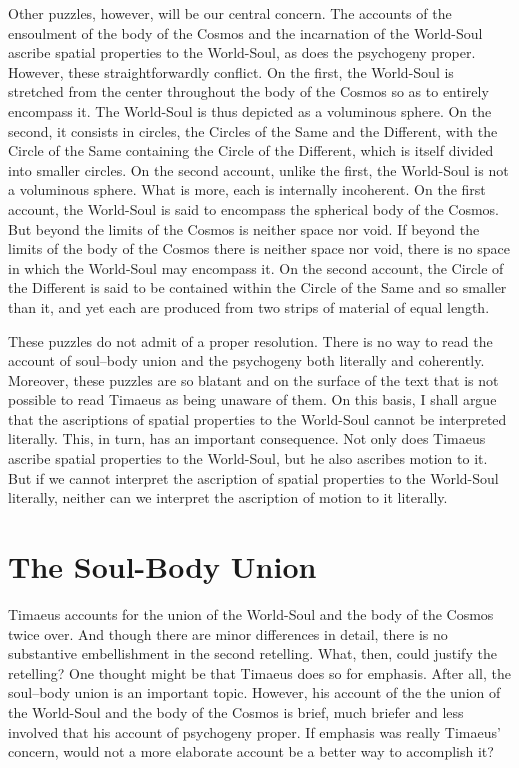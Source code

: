 Other puzzles, however, will be our central concern. The accounts of the ensoulment of the body of the Cosmos and the incarnation of the World-Soul ascribe spatial properties to the World-Soul, as does the psychogeny proper. However, these straightforwardly conflict. On the first, the World-Soul is stretched from the center throughout the body of the Cosmos so as to entirely encompass it. The World-Soul is thus depicted as a voluminous sphere. On the second, it consists in circles, the Circles of the Same and the Different, with the Circle of the Same containing the Circle of the Different, which is itself divided into smaller circles. On the second account, unlike the first, the World-Soul is not a voluminous sphere. What is more, each is internally incoherent. On the first account, the World-Soul is said to encompass the spherical body of the Cosmos. But beyond the limits of the Cosmos is neither space nor void. If beyond the limits of the body of the Cosmos there is neither space nor void, there is no space in which the World-Soul may encompass it. On the second account, the Circle of the Different is said to be contained within the Circle of the Same and so smaller than it, and yet each are produced from two strips of material of equal length. 

These puzzles do not admit of a proper resolution. There is no way to read the account of soul--body union and the psychogeny both literally and coherently. Moreover, these puzzles are so blatant and on the surface of the text that is not possible to read Timaeus as being unaware of them. On this basis, I shall argue that the ascriptions of spatial properties to the World-Soul cannot be interpreted literally. This, in turn, has an important consequence. Not only does Timaeus ascribe spatial properties to the World-Soul, but he also ascribes motion to it. But if we cannot interpret the ascription of spatial properties to the World-Soul literally, neither can we interpret the ascription of motion to it literally. 


\section{The Soul-Body Union} %
\label{sec:the_embodiment_of_the_world_soul}

Timaeus accounts for the union of the World-Soul and the body of the Cosmos twice over. And though there are minor differences in detail, there is no substantive embellishment in the second retelling. What, then, could justify the retelling? One thought might be that Timaeus does so for emphasis. After all, the soul--body union is an important topic. However, his account of the the union of the World-Soul and the body of the Cosmos is brief, much briefer and less involved that his account of psychogeny proper. If emphasis was really Timaeus' concern, would not a more elaborate account be a better way to accomplish it? 


